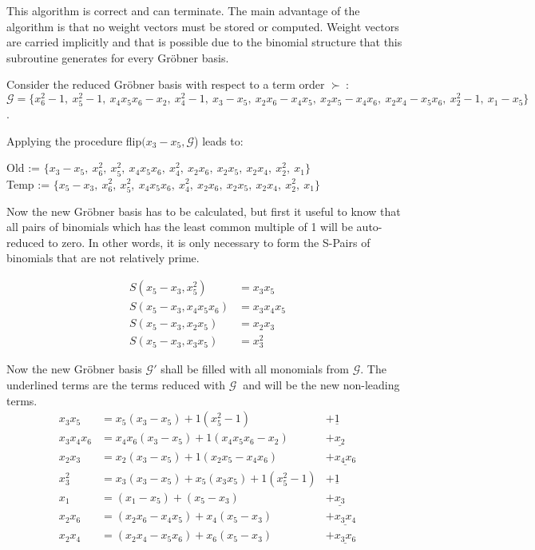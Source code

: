 This algorithm is correct and can terminate.\cite{tigers}
The main advantage of the algorithm is that no weight vectors must be stored or computed.
Weight vectors are carried implicitly and that is possible due to the binomial structure that this subroutine generates for every Gröbner basis.

\begin{env_example}\normalfont
Consider the reduced Gröbner basis with respect to a term order $\succ~$: $\mathcal{G}= \{x_{6}^{2}-1,~x_{5}^{2}-1,~x_{4}x_{5}x_{6} -x_{2},~x_{4}^{2}-1,~x_{3}-x_{5},~x_{2}x_{6}-x_{4}x_{5},~x_{2}x_{5}-x_{4}x_{6},~x_{2}x_{4}-x_{5}x_{6},~x_{2}^{2}-1,~x_{1}-x_{5}  \} $.

Applying the procedure flip$(x_{3}-x_{5}, \mathcal{G}$) leads to:

Old := $\{x_{3}-x_{5},~x_{6}^{2},~x_{5}^{2},~x_{4}x_{5}x_{6} ,~x_{4}^{2},~x_{2}x_{6},~x_{2}x_{5},~x_{2}x_{4},~x_{2}^{2},~x_{1} \} $ \\
Temp := $\{x_{5}-x_{3},~x_{6}^{2},~x_{5}^{2},~x_{4}x_{5}x_{6} ,~x_{4}^{2},~x_{2}x_{6},~x_{2}x_{5},~x_{2}x_{4},~x_{2}^{2},~x_{1} \} $

Now the new Gröbner basis has to be calculated, but first it useful to know that all pairs of binomials which has the least common multiple of 1 will be auto-reduced to zero. In other words, it is only necessary to form the S-Pairs of binomials that are not relatively prime.

\begin{align*}
	S(x_{5}-x_{3},x_{5}^{2}) &= x_{3}x_{5} \\
	S(x_{5}-x_{3},x_{4}x_{5}x_{6}) &= x_{3}x_{4}x_{5} \\
	S(x_{5}-x_{3},x_{2}x_{5}) &= x_{2}x_{3} \\
	S(x_{5}-x_{3},x_{3}x_{5}) &= x_{3}^{2}
\end{align*}

Now the new Gröbner basis $\mathcal{G}'$ shall be filled with all monomials from $\mathcal{G}$.
The underlined terms are the terms reduced with $\mathcal{G}~$ and will be the new non-leading terms.
\begin{align*}
	x_{3}x_{5} &= x_{5}(x_{3}-x_{5}) + 1(x_{5}^{2}-1) &+ \underline{1} \\
	x_{3}x_{4}x_{6} &= x_{4}x_{6}(x_{3}-x_{5}) + 1(x_{4}x_{5}x_{6}-x_{2}) &+ \underline{x_{2}} \\
	x_{2}x_{3} &= x_{2}(x_{3}-x_{5}) + 1(x_{2}x_{5}- x_{4}x_{6}) &+ \underline{x_{4}x_{6}} \\
	x_{3}^{2} &= x_{3}(x_{3}-x_{5}) + x_{5}(x_{3}x_{5}) + 1(x_{5}^{2}-1)&+\underline{1} \\
	x_{1} &= (x_{1}-x_{5}) + (x_{5}-x_{3}) &+\underline{ x_{3}} \\
	x_{2}x_{6} &= (x_{2}x_{6}-x_{4}x_{5}) + x_{4}(x_{5}-x_{3}) &+\underline{ x_{3}x_{4}} \\
	x_{2}x_{4} &= (x_{2}x_{4}-x_{5}x_{6})+ x_{6}(x_{5}-x_{3}) &+\underline{x_{3}x_{6}}
\end{align*}


\end{env_example}
